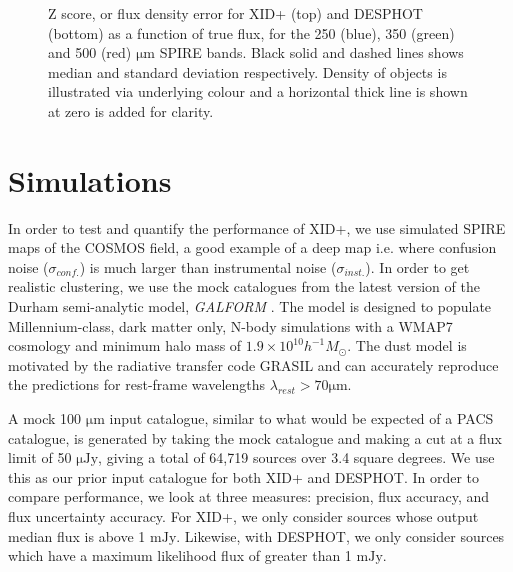 \documentclass[useAMS,usenatbib]{mnras}
\begin{document}
\begin{figure}
\caption{Z score, or flux density error for \textsc{XID+} (top) and \textsc{DESPHOT} (bottom) as a function of true flux, for the 250 (blue), 350 (green) and 500 (red) $\mathrm{\mu m}$ SPIRE bands. Black solid and dashed lines shows median and standard deviation respectively. Density of objects is illustrated via underlying colour and a horizontal thick line is shown at zero is added for clarity.}\label{fig:zscore}
\end{figure}

\section{Simulations}\label{sec:sims}
In order to test and quantify the performance of XID+, we use simulated SPIRE maps of the COSMOS field, a good example of a deep map i.e. where confusion noise ($\sigma_{conf.}$) is much larger than instrumental noise ($\sigma_{inst.}$). In order to get realistic clustering, we use the mock catalogues from the latest version of the Durham semi-analytic model, \emph{GALFORM} \citep{Lacey:2015,Cowley:2014}. The model is designed to populate Millennium-class, dark matter only, N-body simulations with a WMAP7 cosmology and minimum halo mass of $1.9 \times 10^{10} h^{-1} M_{\odot}$. The dust model is motivated by the radiative transfer code GRASIL \citep{Silva:1998} and can accurately reproduce the predictions for rest-frame wavelengths $\lambda_{rest} > 70 \mathrm{\mu m}$.

A mock 100 $\mathrm{\mu m}$ input catalogue, similar to what would be expected of a PACS catalogue, is generated by taking the mock catalogue and making a cut at a flux limit of 50 $\mathrm{\mu Jy}$, giving a total of 64,719 sources over 3.4 square degrees. We use this as our prior input catalogue for both \textsc{XID+} and \textsc{DESPHOT}. In order to compare performance, we look at three measures: precision, flux accuracy, and flux uncertainty accuracy. For \textsc{XID+}, we only consider sources whose output median flux is above 1 $\mathrm{mJy}$. Likewise, with \textsc{DESPHOT}, we only consider sources which have a maximum likelihood flux of greater than 1 $\mathrm{mJy}$. 
\end{document}
